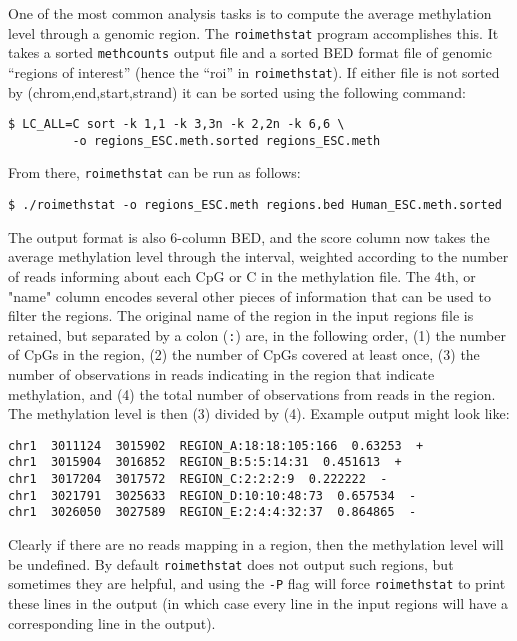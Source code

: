 \documentclass[10pt]{article}
\newcommand{\prog}[1]{\texttt{#1}}
\newcommand{\lit}[1]{\texttt{#1}}
\newcommand{\op}[1]{\texttt{#1}}
\begin{document}
One of the most common analysis tasks is to compute the average
methylation level through a genomic region. The \prog{roimethstat}
program accomplishes this. It takes a sorted \prog{methcounts} output
file and a sorted BED format file of genomic ``regions of interest''
(hence the ``roi'' in \prog{roimethstat}).  If either file is not
sorted by (chrom,end,start,strand) it can be sorted using the
following command:
\begin{verbatim}
$ LC_ALL=C sort -k 1,1 -k 3,3n -k 2,2n -k 6,6 \
         -o regions_ESC.meth.sorted regions_ESC.meth
\end{verbatim}
From there, \prog{roimethstat} can be run as follows:
\begin{verbatim}
$ ./roimethstat -o regions_ESC.meth regions.bed Human_ESC.meth.sorted
\end{verbatim}
The output format is also 6-column BED, and the score column now takes
the average methylation level through the interval, weighted according
to the number of reads informing about each CpG or C in the
methylation file. The 4th, or "name" column encodes several other
pieces of information that can be used to filter the regions. The
original name of the region in the input regions file is retained, but
separated by a colon (\lit{:}) are, in the following order, (1) the
number of CpGs in the region, (2) the number of CpGs covered at least
once, (3) the number of observations in reads indicating in the region
that indicate methylation, and (4) the total number of observations
from reads in the region. The methylation level is then (3) divided by
(4). Example output might look like:
\begin{verbatim}
chr1  3011124  3015902  REGION_A:18:18:105:166  0.63253  +
chr1  3015904  3016852  REGION_B:5:5:14:31  0.451613  +
chr1  3017204  3017572  REGION_C:2:2:2:9  0.222222  -
chr1  3021791  3025633  REGION_D:10:10:48:73  0.657534  -
chr1  3026050  3027589  REGION_E:2:4:4:32:37  0.864865  -
\end{verbatim}
Clearly if there are no reads mapping in a region, then the
methylation level will be undefined. By default \prog{roimethstat}
does not output such regions, but sometimes they are helpful, and
using the \op{-P} flag will force \prog{roimethstat} to print these
lines in the output (in which case every line in the input regions
will have a corresponding line in the output).

\end{document}
